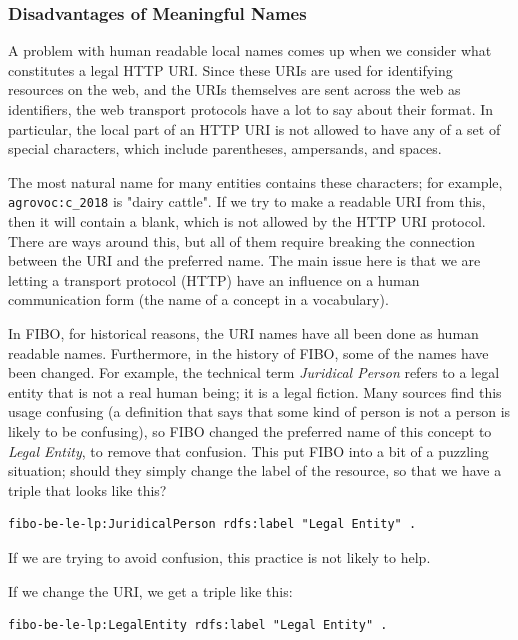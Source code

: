 \subsubsection{Disadvantages of Meaningful Names}


A problem with human readable local names comes up when we consider what constitutes 
a legal HTTP URI.  Since these URIs are used for identifying resources on the web, and
the URIs themselves are sent across the web as identifiers, the web transport protocols 
have a lot to say about their format.  In particular, the local part of an HTTP URI 
is not allowed to have any of a set of special characters, which include parentheses, ampersands, and spaces. 

The most natural name for many entities contains these characters; for 
example, \texttt{agrovoc:c\_2018} is "dairy cattle".  If we try to make a 
readable URI from this,
then it will contain a blank, which is not allowed by the HTTP URI protocol.  There
are ways around this, but all of them require breaking the connection between the URI
and the preferred name.  The main issue here is that we are letting a transport
protocol (HTTP) have an influence on a human communication form (the name of 
a concept in a vocabulary). 

In FIBO, for historical reasons, the URI names have all been done as human readable names.
Furthermore, in the history of FIBO, some of the names have been changed.  For example, 
the technical term \emph{Juridical Person} refers to a legal entity that is not a real
human being; it is a legal fiction.  Many sources find this usage confusing (a definition
that says that some kind of person is not a person is likely to be confusing), so 
FIBO changed the preferred name of this concept to \emph{Legal Entity}, to remove 
that confusion.  This put FIBO into a bit of a puzzling situation; should they 
simply change the label of the resource, so that we have a triple that looks like 
this?

\begin{lstlisting}
fibo-be-le-lp:JuridicalPerson rdfs:label "Legal Entity" .
\end{lstlisting}


If we are trying to avoid confusion, this practice is not likely to help. 

If we change the URI, we get a triple like this:

\begin{lstlisting}
fibo-be-le-lp:LegalEntity rdfs:label "Legal Entity" .
\end{lstlisting}


